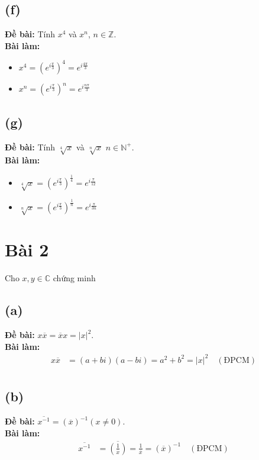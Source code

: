 \subsection{(f)}
\textbf{Đề bài:} Tính $x^{4}$ và $x^{n}$, $n\in\mathbb{Z}$.\\
\textbf{Bài làm:}
\begin{itemize}
    \item $x^{4} = \left(e^{i\frac{\pi}{3}}\right)^4 = e^{i\frac{4\pi}{3}}$
    \item $x^{n} = \left(e^{i\frac{\pi}{3}}\right)^{n} = e^{i\frac{n\pi}{3}}$
\end{itemize}

\subsection{(g)}
\textbf{Đề bài:} Tính $\sqrt[4]{x}$ và $\sqrt[n]{x}$ $n\in\mathbb{N}^{+}$.\\
\textbf{Bài làm:}
\begin{itemize}
    \item $\sqrt[4]{x} = \left(e^{i\frac{\pi}{3}}\right)^{\frac{1}{4}} = e^{i\frac{\pi}{12}}$
    \item $\sqrt[n]{x} = \left(e^{i\frac{\pi}{3}}\right)^{\frac{1}{n}} = e^{i\frac{\pi}{3n}}$
\end{itemize}

\section{Bài 2}
Cho $x, y\in\mathbb{C}$ chứng minh

\subsection{(a)}
\textbf{Đề bài:} $x\overline{x}=\overline{x}x=|x|^{2}$.\\
\textbf{Bài làm:}
\begin{align*}
    x \overline{x} &= (a + bi)(a - bi) = a^{2} + b^{2} = |x|^{2} \quad (\text{ĐPCM})\\
\end{align*}

\subsection{(b)}
\textbf{Đề bài:} $\overline{x^{-1}}=(\overline{x})^{-1}(x\ne0)$.\\
\textbf{Bài làm:}
\begin{align*}
    \overline{x^{-1}} &= \overline{\left(\frac{1}{x}\right)} = \frac{1}{\overline{x}} = (\overline{x})^{-1} \quad (\text{ĐPCM})\\
\end{align*}

